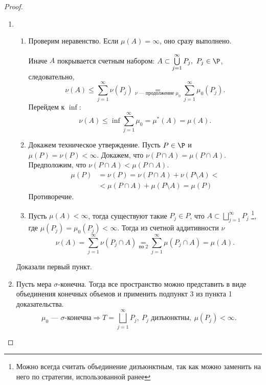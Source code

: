 \begin{proof}
	$ $
	\begin{enumerate}
	    \item 
	\begin{enumerate}[label=\boxed{\arabic*}]
	    \item Проверим неравенство. 
			Если $ \mu(A) = \infty$, оно сразу выполнено. 

			Иначе $ A$ покрывается счетным набором: $ A \subset \bigcup\limits_{j=1}^{\infty} P_j, ~ P_j \in \P$, следовательно, \[
				\nu (A) \le \sum_{j=1}^{\infty} \nu (P_j) \underset{\nu \text{ --- продолжение } \mu_0 }{=} \sum_{j=1}^{\infty} \mu_0(P_j)
	    .\] 
		Перейдем к $ \inf$:
		\[
			\nu (A) \le  \inf \sum_{j=1}^{\infty} \mu_0 = \mu^*( A ) = \mu(A)
		.\] 
	\item Докажем техническое утверждение. Пусть $ P \in \P$ и $ \mu(P) = \nu (P) < \infty$. Докажем, что $ \nu (P \cap A) = \mu(P \cap A)$. Предположим, что $ \nu (P \cap A) < \mu(P \cap A)$.
		\[
		\begin{aligned}
			\mu(P) &= \nu (P) = \nu (P \cap A) + \nu (P \setminus A) < \\&< \mu(P \cap A) + \mu(P \setminus A) = \mu(P)
		\end{aligned}
		\]
		Противоречие.
	\item Пусть $ \mu(A)<\infty$, тогда существуют такие $ P_j \in P$, что $ A \subset \bigsqcup\limits_{j=1}^{\infty} P_j$ \footnote{Можно всегда считать объединение дизъюнктным, так как можно заменить на него по стратегии, использованной ранее}, где $ \mu(P_j) = \mu_0(P_j) < \infty$.
		Тогда из счетной аддитивности $ \nu $
		\[
			\nu (A) =  \sum_{j=1}^{\infty} \nu (P_j \cap A) \underset{\text{по 2}}{=} \sum_{j=1}^{\infty} \mu(P_j \cap A) = \mu(A)
		.\] 
	\end{enumerate} 
		Доказали первый пункт.
\item Пусть мера $ \sigma $-конечна. Тогда все пространство можно представить в виде объединения конечных объемов и применить подпункт 3 из пункта 1 доказательства.
	\[
		\mu_0 \text{ --- }  \sigma \text{-конечна} \Longrightarrow T = \bigsqcup_{j=1}^{\infty} P_j, ~P_j \text{ дизъюнктны},  ~ \mu(P_j) < \infty
	.\] 
	\end{enumerate} 
\end{proof}


		\fontAwesomeSymbol{\faThumbTack}

